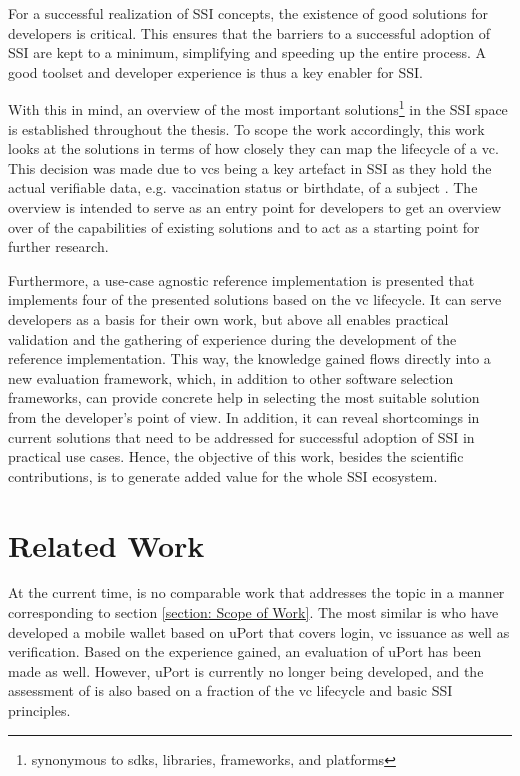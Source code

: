 	For a successful realization of \ac{SSI} concepts, the existence of good solutions for developers is critical. This ensures that the barriers to a successful adoption of \ac{SSI} are kept to a minimum, simplifying and speeding up the entire process. A good toolset and developer experience is thus a key enabler for \ac{SSI}.
	
	With this in mind, an overview of the most important solutions\footnote{synonymous to \acp{sdk}, libraries, frameworks, and platforms} in the \ac{SSI} space is established throughout the thesis. To scope the work accordingly, this work looks at the solutions in terms of how closely they can map the lifecycle of a \acf{vc}. This decision was made due to \acsp{vc} being a key artefact in \ac{SSI} as they hold the actual verifiable data, e.g. vaccination status or birthdate, of a subject \cite{sporny_verifiable_2019}. The overview is intended to serve as an entry point for developers to get an overview over of the capabilities of existing solutions and to act as a starting point for further research. 
	
	Furthermore, a use-case agnostic reference implementation is presented that implements four of the presented solutions based on the \ac{vc} lifecycle. It can serve developers as a basis for their own work, but above all enables practical validation and the gathering of experience during the development of the reference implementation. This way, the knowledge gained flows directly into a new evaluation framework, which, in addition to other software selection frameworks, can provide concrete help in selecting the most suitable solution from the developer's point of view. In addition, it can reveal shortcomings in current solutions that need to be addressed for successful adoption of \ac{SSI} in practical use cases. Hence, the objective of this work, besides the scientific contributions, is to generate added value for the whole \ac{SSI} ecosystem.
	
	\section{Related Work} %
	
	At the current time, is no comparable work that addresses the topic in a manner corresponding to section \ref{section: Scope of Work}. The most similar is \cite{naik_uport_2020} who have developed a mobile wallet based on uPort that covers login, \ac{vc} issuance as well as verification. Based on the experience gained, an evaluation of uPort has been made as well. However, uPort is currently no longer being developed, and the assessment of \cite{naik_uport_2020} is also based on a fraction of the \acs{vc} lifecycle and basic \ac{SSI} principles.
	

